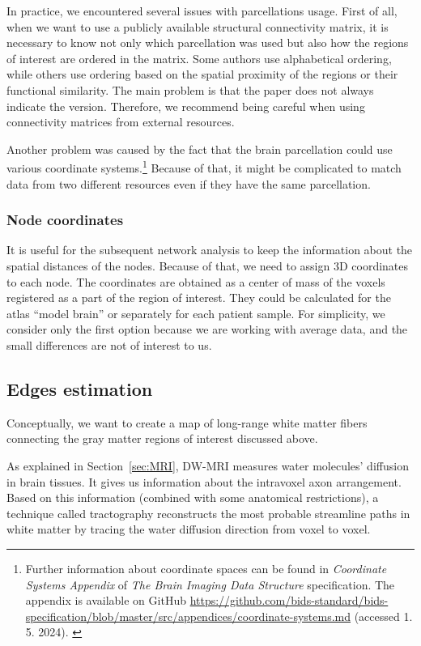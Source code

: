 In practice, we encountered several issues with parcellations usage. First of all, when we want to use a publicly available structural connectivity matrix, it is necessary to know not only which parcellation was used but also how the regions of interest are ordered in the matrix. Some authors use alphabetical ordering, while others use ordering based on the spatial proximity of the regions or their functional similarity. The main problem is that the paper does not always indicate the version. Therefore, we recommend being careful when using connectivity matrices from external resources.

Another problem was caused by the fact that the brain parcellation could use various coordinate systems.\footnote{Further information about coordinate spaces can be found in \textit{Coordinate Systems Appendix} of \textit{The Brain Imaging Data Structure} specification. The appendix is available on GitHub \url{https://github.com/bids-standard/bids-specification/blob/master/src/appendices/coordinate-systems.md} (accessed 1. 5. 2024). \cite{gorgolewski_brain_2016}} Because of that, it might be complicated to match data from two different resources even if they have the same parcellation.


\subsubsection{Node coordinates}

It is useful for the subsequent network analysis to keep the information about the spatial distances of the nodes. Because of that, we need to assign 3D coordinates to each node. The coordinates are obtained as a center of mass of the voxels registered as a part of the region of interest. They could be calculated for the atlas \enquote{model brain} or separately for each patient sample. For simplicity, we consider only the first option because we are working with average data, and the small differences are not of interest to us.

\subsection{Edges estimation}\label{sec:edge_estimation}

Conceptually, we want to create a map of long-range white matter fibers connecting the gray matter regions of interest discussed above. 

As explained in Section~\ref{sec:MRI}, DW-MRI measures water molecules' diffusion in brain tissues. It gives us information about the intravoxel axon arrangement. Based on this information (combined with some anatomical restrictions), a technique called tractography reconstructs the most probable streamline paths in white matter by tracing the water diffusion direction from voxel to voxel. \cite{yeh_mapping_2021,iturria-medina_characterizing_2007} 

